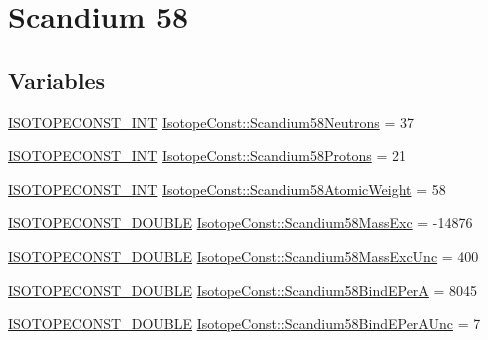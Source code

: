 \hypertarget{group___isotope_const-_scandium-_sc58}{}\section{Scandium 58}
\label{group___isotope_const-_scandium-_sc58}
\subsection*{Variables}
\begin{DoxyCompactItemize}
\item 
\mbox{\hyperlink{group___isotope_const-_macros_ga5f18360b3e99483a35c32d789e62621c}{I\+S\+O\+T\+O\+P\+E\+C\+O\+N\+S\+T\+\_\+\+I\+NT}} \mbox{\hyperlink{group___isotope_const-_scandium-_sc58_gaa4bff2bea03af9c36346131f801d1676}{Isotope\+Const\+::\+Scandium58\+Neutrons}} = 37
\item 
\mbox{\hyperlink{group___isotope_const-_macros_ga5f18360b3e99483a35c32d789e62621c}{I\+S\+O\+T\+O\+P\+E\+C\+O\+N\+S\+T\+\_\+\+I\+NT}} \mbox{\hyperlink{group___isotope_const-_scandium-_sc58_gaa1b7ccdd67b8484ae8379210e18ae095}{Isotope\+Const\+::\+Scandium58\+Protons}} = 21
\item 
\mbox{\hyperlink{group___isotope_const-_macros_ga5f18360b3e99483a35c32d789e62621c}{I\+S\+O\+T\+O\+P\+E\+C\+O\+N\+S\+T\+\_\+\+I\+NT}} \mbox{\hyperlink{group___isotope_const-_scandium-_sc58_gaa78ed340638627e1224a96abd013d3d8}{Isotope\+Const\+::\+Scandium58\+Atomic\+Weight}} = 58
\item 
\mbox{\hyperlink{group___isotope_const-_macros_ga8f45a7272ce02c0b4c65c44636ed719a}{I\+S\+O\+T\+O\+P\+E\+C\+O\+N\+S\+T\+\_\+\+D\+O\+U\+B\+LE}} \mbox{\hyperlink{group___isotope_const-_scandium-_sc58_ga93139af3f87afefeb7b5c5f43edae014}{Isotope\+Const\+::\+Scandium58\+Mass\+Exc}} = -\/14876
\item 
\mbox{\hyperlink{group___isotope_const-_macros_ga8f45a7272ce02c0b4c65c44636ed719a}{I\+S\+O\+T\+O\+P\+E\+C\+O\+N\+S\+T\+\_\+\+D\+O\+U\+B\+LE}} \mbox{\hyperlink{group___isotope_const-_scandium-_sc58_ga4168be02bf456b5bfa26de9fafc3b03d}{Isotope\+Const\+::\+Scandium58\+Mass\+Exc\+Unc}} = 400
\item 
\mbox{\hyperlink{group___isotope_const-_macros_ga8f45a7272ce02c0b4c65c44636ed719a}{I\+S\+O\+T\+O\+P\+E\+C\+O\+N\+S\+T\+\_\+\+D\+O\+U\+B\+LE}} \mbox{\hyperlink{group___isotope_const-_scandium-_sc58_gae45013e0ba92125b5a73f227c3e86806}{Isotope\+Const\+::\+Scandium58\+Bind\+E\+PerA}} = 8045
\item 
\mbox{\hyperlink{group___isotope_const-_macros_ga8f45a7272ce02c0b4c65c44636ed719a}{I\+S\+O\+T\+O\+P\+E\+C\+O\+N\+S\+T\+\_\+\+D\+O\+U\+B\+LE}} \mbox{\hyperlink{group___isotope_const-_scandium-_sc58_ga8482eb0d972b3b60b7bbe3709dd2d8e7}{Isotope\+Const\+::\+Scandium58\+Bind\+E\+Per\+A\+Unc}} = 7

\end{DoxyCompactItemize}
